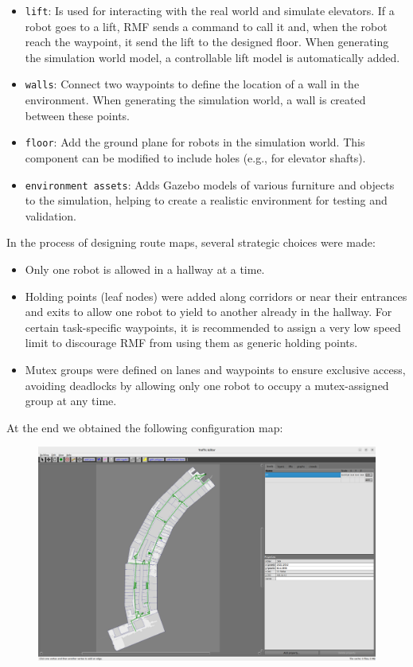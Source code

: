 \begin{itemize}
	\item \texttt{lift}: Is used for interacting with the real world and simulate elevators. If a robot goes to a lift, RMF sends a command to call it and, when the robot reach the waypoint, it send the lift to the designed floor. When generating the simulation world model, a controllable lift model is automatically added.
	\item \texttt{walls}: Connect two waypoints to define the location of a wall in the environment. When generating the simulation world, a wall is created between these points.
	\item \texttt{floor}:  Add the ground plane for robots in the simulation world. This component can be modified to include holes (e.g., for elevator shafts).
	\item \texttt{environment assets}: Adds Gazebo models of various furniture and objects to the simulation, helping to create a realistic environment for testing and validation.
\end{itemize}
In the process of designing route maps, several strategic choices were made:
\begin{itemize}
	\item Only one robot is allowed in a hallway at a time.
	\item Holding points (leaf nodes) were added along corridors or near their entrances and exits to allow one robot to yield to another already in the hallway. For certain task-specific waypoints, it is recommended to assign a very low speed limit to discourage RMF from using them as generic holding points.
	\item Mutex groups were defined on lanes and waypoints to ensure exclusive access, avoiding deadlocks by allowing only one robot to occupy a mutex-assigned group at any time.
\end{itemize}
\newpage
At the end we obtained the following configuration map:\\
\begin{figure}[h]
\centering
\includegraphics[width=1\linewidth]{img/RMF-traffic-map.png}
\end{figure}\\
